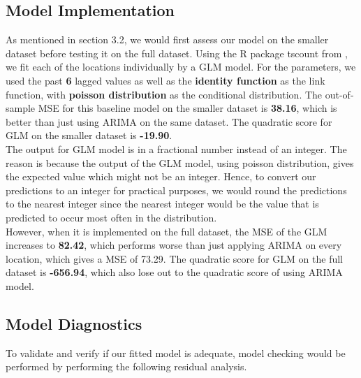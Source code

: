 \documentclass[nonblindrev,msom]{informs3} %
\begin{document}



\subsection{Model Implementation}
\noindent As mentioned in section 3.2, we would first assess our model on the smaller dataset before testing it on the full dataset. Using the R package tscount from \cite{Tobias2017}, we fit each of the locations individually by a GLM model. For the parameters, we used the past \textbf{6} lagged values as well as the \textbf{identity function} as the link function, with \textbf{poisson distribution} as the conditional distribution. The out-of-sample MSE for this baseline model on the smaller dataset is \textbf{38.16}, which is better than just using ARIMA on the same dataset. The quadratic score for GLM on the smaller dataset is \textbf{-19.90}. \\

\noindent The output for GLM model is in a fractional number instead of an integer. The reason is because the output of the GLM model, using poisson distribution, gives the expected value which might not be an integer. Hence, to convert our predictions to an integer for practical purposes, we would round the predictions to the nearest integer since the nearest integer would be the value that is predicted to occur most often in the distribution. \\

\noindent However, when it is implemented on the full dataset, the MSE of the GLM increases to \textbf{82.42}, which performs worse than just applying ARIMA on every location, which gives a MSE of 73.29. The quadratic score for GLM on the full dataset is \textbf{-656.94}, which also lose out to the quadratic score of using ARIMA model.

\subsection{Model Diagnostics}
To validate and verify if our fitted model is adequate, model checking would be performed by performing the following residual analysis.		
\end{document}
